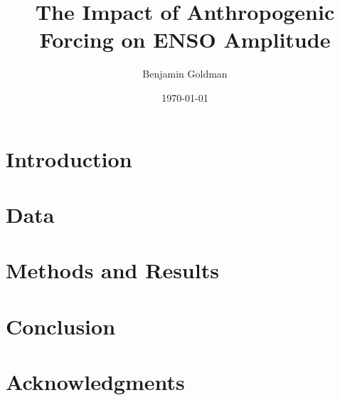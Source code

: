 \documentclass[11pt]{article}
\author{Benjamin Goldman}
\date{\today}
\title{The Impact of Anthropogenic Forcing on ENSO Amplitude}
\begin{document}
\maketitle
\begin{abstract}

\end{abstract}

\section{Introduction}
\label{sec:org1b56736}
\section{Data}
\label{sec:orgaaab045}
\section{Methods and Results}
\label{sec:org3f97e45}
\section{Conclusion}
\label{sec:org0e6ec22}
\section{Acknowledgments}
\label{sec:orgaaa58bc}



\end{document}
